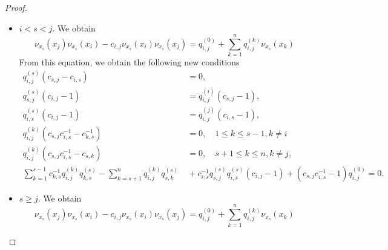 \documentclass{amsart}
\theoremstyle{definition}
\theoremstyle{remark}
\numberwithin{equation}{section}
\begin{document}
\begin{proof}
\begin{itemize}
    \begin{equation*}
        \nu_{x_s}(x_j)\nu_{x_s}(x_i)-c_{i,j}\nu_{x_s}(x_i)\nu_{x_s}(x_j) = q_{i,j}^{(0)}+\sum_{k=1}^{n}q_{i,j}^{(k)}\nu_{x_s}(x_k)
    \end{equation*}
    From this equation, we obtain the following new conditions
    \begin{align*}
        q_{i,j}^{(s)}(c_{s,j}c_{s,i}-1) &\ =0, \\
        q_{s,j}^{(s)}(c_{i,j}-1) &\ = q_{i,j}^{(i)}(c_{s,j}-1), \\
        q_{s,i}^{(s)}(c_{i,j}-1) &\ = q_{i,j}^{(j)}(c_{s,i}-1), \\
        q_{i,j}^{(k)}(c_{s,j}c_{s,i}-c_{k,s}^{-1}) &\ =0, \quad 1\leq k \leq s-1, \\
        q_{i,j}^{(k)}(c_{s,j}c_{s,i}-c_{s,k}) &\ =0, \quad s+1\leq k \leq n, k\ne i, j, \\
        \sum_{k=1}^{s-1}c_{k,s}^{-1}q_{i,j}^{(k)}q_{k,s}^{(s)}-\sum_{k=s+1}^{n}q_{i,j}^{(k)}q_{k,s}^{(s)} &\ +q_{s,i}^{(s)}q_{s,j}^{(s)}(1-c_{i,j})+(c_{s,j}c_{s,i}-1)q_{i,j}^{(0)}  = 0.
    \end{align*}
    \item $i < s < j$. We obtain
    \begin{equation*}
        \nu_{x_s}(x_j)\nu_{x_s}(x_i)-c_{i,j}\nu_{x_s}(x_i)\nu_{x_s}(x_j) = q_{i,j}^{(0)}+\sum_{k=1}^{n}q_{i,j}^{(k)}\nu_{x_s}(x_k)
    \end{equation*}
    From this equation, we obtain the following new conditions
    \begin{align*}
        q_{i,j}^{(s)}(c_{s,j}-c_{i,s}) &\ =0, \\
        q_{s,j}^{(s)}(c_{i,j}-1) &\ = q_{i,j}^{(i)}(c_{s,j}-1), \\
        q_{i,s}^{(s)}(c_{i,j}-1) &\ = q_{i,j}^{(j)}(c_{i,s}-1), \\
        q_{i,j}^{(k)}(c_{s,j}c_{i,s}^{-1}-c_{k,s}^{-1}) &\ =0, \quad 1\leq k \leq s-1, k \ne i\\
        q_{i,j}^{(k)}(c_{s,j}c_{i,s}^{-1}-c_{s,k}) &\ =0, \quad s+1\leq k \leq n, k\ne j, \\
        \sum_{k=1}^{s-1}c_{k,s}^{-1}q_{i,j}^{(k)}q_{k,s}^{(s)} -  \sum_{k=s+1}^{n}q_{i,j}^{(k)}q_{s,k}^{(s)} &\ + c_{i,s}^{-1}q_{s,j}^{(s)}q_{i,s}^{(s)}(c_{i,j}-1)  +(c_{s,j}c_{i,s}^{-1}-1)q_{i,j}^{(0)}  = 0.
    \end{align*}
    \item $s\geq j$. We obtain
    \begin{equation*}
        \nu_{x_s}(x_j)\nu_{x_s}(x_i)-c_{i,j}\nu_{x_s}(x_i)\nu_{x_s}(x_j) = q_{i,j}^{(0)}+\sum_{k=1}^{n}q_{i,j}^{(k)}\nu_{x_s}(x_k)

\end{equation*}
\end{itemize}
\end{proof}
\end{document}
